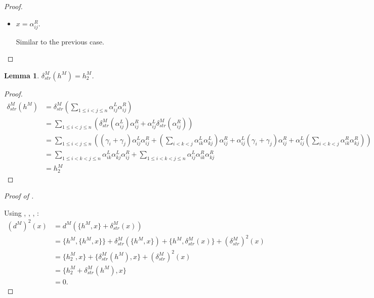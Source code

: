 \documentclass[a4paper,final, reqno]{amsart}
\theoremstyle{plain}
\newtheorem{Lemma}[Th]{Lemma}
\theoremstyle{definition}
\begin{document}
\begin{proof}
\begin{itemize}
			(all other terms vanish) and one may check that $F = E$, $G = C+D$, $H = C'+D'$, and $I=E'$. 
			
			\item $x=\alpha_{ij}^R$.
			
			Similar to the previous case.
			
		\end{itemize}
		
		
		
	\end{proof}
	
	
	\begin{Lemma} \label{lem:deltahM}
		$\delta_{str}^M(h^M) = h_2^M$.
	\end{Lemma}
	\begin{proof}
		\begin{align*}
			\delta_{str}^M(h^M) &= \delta_{str}^M\left( \sum_{1\leq i<j\leq n} \alpha_{ij}^L \alpha_{ij}^R \right) \\
			&= \sum_{1\leq i<j\leq n} \left( \delta_{str}^M(\alpha_{ij}^L)\alpha_{ij}^R +  \alpha_{ij}^L\delta_{str}^M(\alpha_{ij}^R) \right) \\
			&= \sum_{1\leq i<j\leq n} \left( (\gamma_i+\gamma_j)\alpha_{ij}^L\alpha_{ij}^R + \left(\sum_{i<k<j} \alpha_{ik}^L\alpha_{kj}^L\right) \alpha_{ij}^R +  \alpha_{ij}^L (\gamma_i+\gamma_j)\alpha_{ij}^R + \alpha_{ij}^L \left(\sum_{i<k<j} \alpha_{ik}^R\alpha_{kj}^R\right)  \right) \\
			&= \sum_{1\leq i<k<j\leq n} \alpha_{ik}^L \alpha_{kj}^L\alpha_{ij}^R + \sum_{1\leq i<k<j\leq n} \alpha_{ij}^L \alpha_{ik}^R\alpha_{kj}^R \\
			&= h_2^M 
		\end{align*}
	\end{proof}
	
	
	\begin{proof}[Proof of ] \-\
		
		Using , , , :
		\begin{align*}
			(d^M)^2(x) &= d^M(\{h^M, x\} + \delta_{str}^M(x)) \\
			&= \{h^M, \{h^M, x\}\} + \delta_{str}^M\left( \{h^M, x\} \right) + \{h^M, \delta_{str}^M(x)\} + (\delta_{str}^M)^2(x) \\
			&= \{h_2^M, x\} + \{\delta_{str}^M(h^M), x\} + (\delta_{str}^M)^2(x) \\
			&= \{h_2^M + \delta_{str}^M(h^M), x\} \\
			&= 0.
		\end{align*}
	\end{proof}
	
\end{document}
